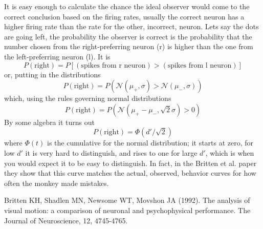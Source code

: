 \documentclass[11pt,a4paper]{scrartcl}
\begin{document}
It is easy enough to calculate the chance the ideal observer would
come to the correct conclusion based on the firing rates, usually the
correct neuron has a higher firing rate than the rate for the other,
incorrect, neuron. Lets say the dots are going left, the probability
the observer is correct is the probability that the number chosen from
the right-preferring neuron (r) is higher than the one from the left-preferring
neuron (l). It is
\begin{equation}
P(\mbox{right})=P[(\mbox{spikes from r neuron})>(\mbox{spikes from l neuron})]
\end{equation}
or, putting in the distributions
\begin{equation}
P(\mbox{right})=P(\mathcal{N}(\mu_+,\sigma)>\mathcal{N}(\mu_-,\sigma))
\end{equation}
which, using the rules governing normal distributions
\begin{equation}
P(\mbox{right})=P(\mathcal{N}(\mu_+-\mu_-,\sqrt{2}\sigma)>0)
\end{equation}
By some algebra it turns out
\begin{equation}
P(\mbox{right})=\Phi(d'/\sqrt{2})
\end{equation}
where $\Phi(t)$ is the cumulative for the normal distribution; it
starts at zero, for low $d'$ it is very hard to distinguish, and rises
to one for large $d'$, which is when you would expect it to be easy to
distinguish. In fact, in the Britten et al. paper
\cite{BrittenEtAl1992} they show that this curve matches the actual,
observed, behavior curves for how often the monkey made mistakes.

\begin{thebibliography}{10}

Britten KH, Shadlen MN, Newsome WT, Movshon JA (1992). The analysis of visual motion: a comparison of neuronal and psychophysical performance. 
\newblock The Journal of Neuroscience, 12, 4745-4765.

\end{thebibliography}
\end{document}
